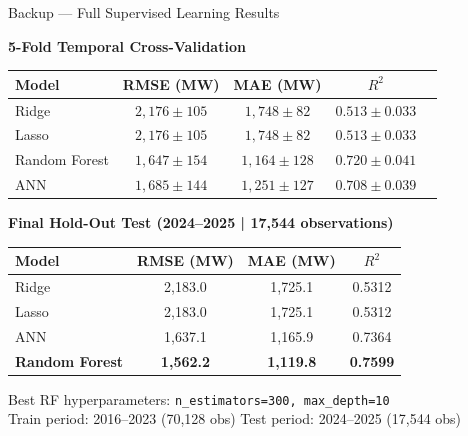 \documentclass[aspectratio=169, 10pt]{beamer}
\begin{document}
\begin{frame}{Backup — Full Supervised Learning Results}

\centering
\textbf{5-Fold Temporal Cross-Validation}

\vspace{0.4em}
\begin{tabular}{@{}lcccc@{}}
\toprule
Model & RMSE (MW) & MAE (MW) & $R^2$ \\
\midrule
Ridge        & $2{,}176 \pm 105$ & $1{,}748 \pm 82$  & $0.513 \pm 0.033$ \\
Lasso        & $2{,}176 \pm 105$ & $1{,}748 \pm 82$  & $0.513 \pm 0.033$ \\
Random Forest & $1{,}647 \pm 154$ & $1{,}164 \pm 128$ & $0.720 \pm 0.041$ \\
ANN          & $1{,}685 \pm 144$ & $1{,}251 \pm 127$ & $0.708 \pm 0.039$ \\
\bottomrule
\end{tabular}

\vspace{0.9em}
\textbf{Final Hold-Out Test (2024–2025 | 17,544 observations)}

\vspace{0.4em}
\begin{tabular}{@{}lccc@{}}
\toprule
Model & RMSE (MW) & MAE (MW) & $R^2$ \\
\midrule
Ridge                    & 2,183.0 & 1,725.1 & 0.5312 \\
Lasso                    & 2,183.0 & 1,725.1 & 0.5312 \\
ANN                      & 1,637.1 & 1,165.9 & 0.7364 \\
\textbf{Random Forest}   & \textbf{1,562.2} & \textbf{1,119.8} & \textbf{0.7599} \\
\bottomrule
\end{tabular}

\vspace{0.5em}
\small Best RF hyperparameters: \texttt{n\_estimators=300, max\_depth=10}\\
Train period: 2016–2023 (70,128 obs) \quad Test period: 2024–2025 (17,544 obs)

\end{frame}
\end{document}
